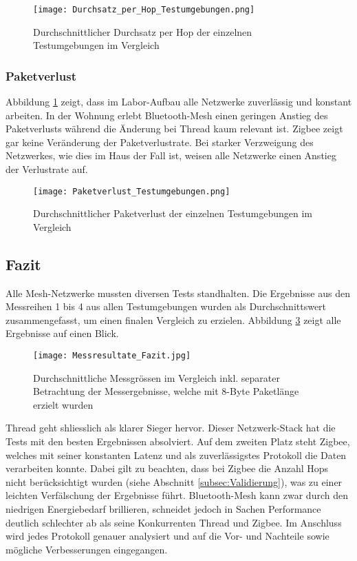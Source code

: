 \begin{figure}[H]
	\centering
	\texttt{[image: Durchsatz\_per\_Hop\_Testumgebungen.png]}
	\caption{Durchschnittlicher Durchsatz per Hop der einzelnen Testumgebungen im Vergleich}\label{fig:Durchsätze_per_Hop_Testumgebungen}
\end{figure}

\subsubsection{Paketverlust}\label{subsec:VergleichPaketverlustTestumgebungen}
Abbildung \ref{fig:Durchsätze_per_Hop_Testumgebungen} zeigt, dass im Labor-Aufbau alle Netzwerke zuverlässig und konstant arbeiten.
In der Wohnung erlebt Bluetooth-Mesh einen geringen Anstieg des Paketverlusts während die Änderung bei Thread kaum relevant ist.
Zigbee zeigt gar keine Veränderung der Paketverlustrate.
Bei starker Verzweigung des Netzwerkes, wie dies im Haus der Fall ist, weisen alle Netzwerke einen Anstieg der Verlustrate auf.


\begin{figure}[H]
	\centering
	\texttt{[image: Paketverlust\_Testumgebungen.png]}
	\caption{Durchschnittlicher Paketverlust der einzelnen Testumgebungen im Vergleich}\label{fig:PaketverlusteTestumgebungen}
\end{figure}

\subsection{Fazit}\label{subsec:FazitVergleich}
Alle Mesh-Netzwerke mussten diversen Tests standhalten. Die Ergebnisse aus den Messreihen 1 bis 4 aus allen Testumgebungen wurden als Durchschnittswert zusammengefasst, um einen finalen Vergleich zu erzielen. Abbildung \ref{fig:Messresultate_Fazit} zeigt alle Ergebnisse auf einen Blick.

\begin{figure}[H]
	\centering
	\texttt{[image: Messresultate\_Fazit.jpg]}
	\caption{Durchschnittliche Messgrössen im Vergleich inkl. separater Betrachtung der Messergebnisse, welche mit 8-Byte Paketlänge erzielt wurden}\label{fig:Messresultate_Fazit}
\end{figure}

Thread geht shliesslich als klarer Sieger hervor.
Dieser Netzwerk-Stack hat die Tests mit den besten Ergebnissen absolviert.
Auf dem zweiten Platz steht Zigbee, welches mit seiner konstanten Latenz und als zuverlässigstes Protokoll die Daten verarbeiten konnte.
Dabei gilt zu beachten, dass bei Zigbee die Anzahl Hops nicht berücksichtigt wurden (siehe Abschnitt \ref{subsec:Validierung}), was zu einer leichten Verfälschung der Ergebnisse führt.
Bluetooth-Mesh kann zwar durch den niedrigen Energiebedarf brillieren, schneidet jedoch in Sachen Performance deutlich schlechter ab als seine Konkurrenten Thread und Zigbee.
Im Anschluss wird jedes Protokoll genauer analysiert und auf die Vor- und Nachteile sowie mögliche Verbesserungen eingegangen. 


